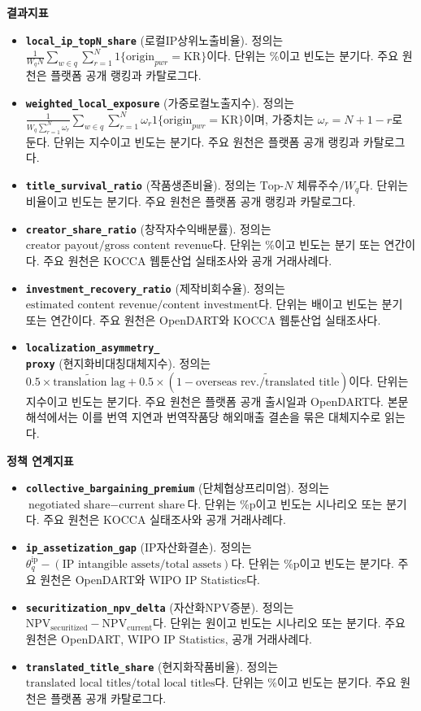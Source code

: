 \documentclass[11pt,a4paper]{report}
\newenvironment{summarylist}{\begin{itemize}[leftmargin=1.8em,itemsep=0.35em,topsep=0.35em]\RaggedRight}{\end{itemize}}
\begin{document}
\begingroup
\footnotesize
\noindent\textbf{결과지표}
\begin{summarylist}
  \item \textbf{\texttt{local\_ip\_topN\_share}} (로컬IP상위노출비율). 정의는 $\frac{1}{W_q N}\sum_{w \in q}\sum_{r=1}^{N}1\{\mathrm{origin}_{pwr}=\mathrm{KR}\}$이다. 단위는 \%이고 빈도는 분기다. 주요 원천은 플랫폼 공개 랭킹과 카탈로그다.
  \item \textbf{\texttt{weighted\_local\_exposure}} (가중로컬노출지수). 정의는 $\frac{1}{W_q \sum_{r=1}^{N}\omega_r}\sum_{w \in q}\sum_{r=1}^{N}\omega_r 1\{\mathrm{origin}_{pwr}=\mathrm{KR}\}$이며, 가중치는 $\omega_r=N+1-r$로 둔다. 단위는 지수이고 빈도는 분기다. 주요 원천은 플랫폼 공개 랭킹과 카탈로그다.
  \item \textbf{\texttt{title\_survival\_ratio}} (작품생존비율). 정의는 $\text{Top-}N\text{ 체류주수}/W_q$다. 단위는 비율이고 빈도는 분기다. 주요 원천은 플랫폼 공개 랭킹과 카탈로그다.
  \item \textbf{\texttt{creator\_share\_ratio}} (창작자수익배분률). 정의는 $\text{creator payout}/\text{gross content revenue}$다. 단위는 \%이고 빈도는 분기 또는 연간이다. 주요 원천은 KOCCA 웹툰산업 실태조사와 공개 거래사례다.
  \item \textbf{\texttt{investment\_recovery\_ratio}} (제작비회수율). 정의는 $\text{estimated content revenue}/\text{content investment}$다. 단위는 배이고 빈도는 분기 또는 연간이다. 주요 원천은 OpenDART와 KOCCA 웹툰산업 실태조사다.
  \item \textbf{\texttt{localization\_asymmetry\_}\\\texttt{proxy}} (현지화비대칭대체지수). 정의는 $0.5 \times \widetilde{\text{translation lag}} + 0.5 \times \left(1-\widetilde{\text{overseas rev./translated title}}\right)$이다. 단위는 지수이고 빈도는 분기다. 주요 원천은 플랫폼 공개 출시일과 OpenDART다. 본문 해석에서는 이를 번역 지연과 번역작품당 해외매출 결손을 묶은 대체지수로 읽는다.
\end{summarylist}

\noindent\textbf{정책 연계지표}
\begin{summarylist}
  \item \textbf{\nolinkurl{collective_bargaining_premium}} (단체협상프리미엄). 정의는 $\text{negotiated share}-\text{current share}$다. 단위는 \%p이고 빈도는 시나리오 또는 분기다. 주요 원천은 KOCCA 실태조사와 공개 거래사례다.
  \item \textbf{\texttt{ip\_assetization\_gap}} (IP자산화결손). 정의는 $\theta^{\mathrm{ip}}_{q}-(\text{IP intangible assets}/\text{total assets})$다. 단위는 \%p이고 빈도는 분기다. 주요 원천은 OpenDART와 WIPO IP Statistics다.
  \item \textbf{\texttt{securitization\_npv\_delta}} (자산화NPV증분). 정의는 $\text{NPV}_{\mathrm{securitized}}-\text{NPV}_{\mathrm{current}}$다. 단위는 원이고 빈도는 시나리오 또는 분기다. 주요 원천은 OpenDART, WIPO IP Statistics, 공개 거래사례다.
  \item \textbf{\texttt{translated\_title\_share}} (현지화작품비율). 정의는 $\text{translated local titles}/\text{total local titles}$다. 단위는 \%이고 빈도는 분기다. 주요 원천은 플랫폼 공개 카탈로그다.
\end{summarylist}
\end{document}
